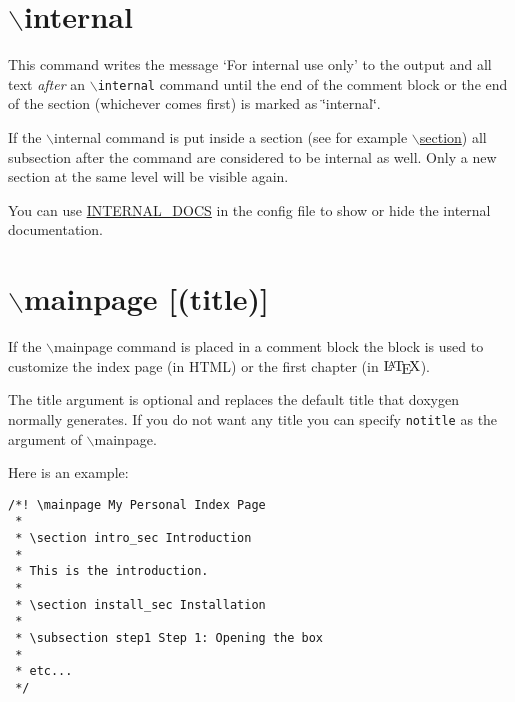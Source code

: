  \hypertarget{commands_cmdinternal}{}\section{$\backslash$internal}\label{commands_cmdinternal}
 This command writes the message `For internal use only' to the output and all text {\em after\/} an {\tt $\backslash$internal} command until the end of the comment block or the end of the section (whichever comes first) is marked as \char`\"{}internal\char`\"{}.

If the $\backslash$internal command is put inside a section (see for example \hyperlink{commands_cmdsection}{$\backslash$section}) all subsection after the command are considered to be internal as well. Only a new section at the same level will be visible again.

You can use \hyperlink{config_cfg_internal_docs}{INTERNAL\_\-DOCS} in the config file to show or hide the internal documentation.



 \hypertarget{commands_cmdmainpage}{}\section{$\backslash$mainpage \mbox{[}(title)\mbox{]}}\label{commands_cmdmainpage}

If the $\backslash$mainpage command is placed in a comment block the block is used to customize the index page (in HTML) or the first chapter (in $\mbox{\LaTeX}$).

The title argument is optional and replaces the default title that doxygen normally generates. If you do not want any title you can specify {\tt notitle} as the argument of $\backslash$mainpage.

Here is an example: 

\footnotesize\begin{verbatim}
/*! \mainpage My Personal Index Page
 *
 * \section intro_sec Introduction
 *
 * This is the introduction.
 *
 * \section install_sec Installation
 *
 * \subsection step1 Step 1: Opening the box
 *  
 * etc...
 */
\end{verbatim}
\normalsize


